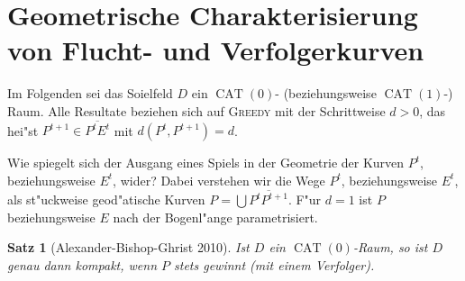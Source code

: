 \documentclass[paper=A4, twoside, chapterprefix=true, bibliography=totoc, headsepline]{scrbook}
\newcommand{\tikzgitter}[3][0.25]{ %
	\draw[step=#1,gray!15] #2 grid #3;
	\draw[step=2*#1,gray!30] #2 grid #3;
	\fill (0,0) circle(0.1); 
}
\DeclareMathOperator{\CAT}{CAT}
\newcommand{\kapit}[1]{\textsc{#1}\xspace} %
\newcommand{\Greedy}{\kapit{Greedy}}
\theoremstyle{nonumberbreak}
\newtheorem{satz}{Satz}
\theoremstyle{emptybreak}
\theoremstyle{break}
\begin{document}

\section{Geometrische Charakterisierung von Flucht- und Verfolgerkurven}

Im Folgenden sei das Soielfeld $D$ ein $\CAT(0)$- (beziehungsweise $\CAT(1)$-) Raum.
Alle Resultate beziehen sich auf \Greedy mit der Schrittweise $d > 0$, das hei"st $P^{t+1} \in \overline{P^t E^t}$ mit $d(P^t, P^{t+1}) = d$.
\begin{center}\end{center}
Wie spiegelt sich der Ausgang eines Spiels in der Geometrie der Kurven $P^t$, beziehungsweise $E^t$, wider?
Dabei verstehen wir die Wege $P^t$, beziehungsweise $E^t$, als st"uckweise geod"atische Kurven $P = \bigcup \overline{P^t P^{t+1}}$.
F"ur $d = 1$ ist $P$ beziehungsweise $E$ nach der Bogenl"ange parametrisiert.

\begin{satz}[Alexander-Bishop-Ghrist 2010]
Ist $D$ ein $\CAT(0)$-Raum, so ist $D$ genau dann kompakt, wenn $P$ stets gewinnt (mit einem Verfolger).
\end{satz}
\end{document}
